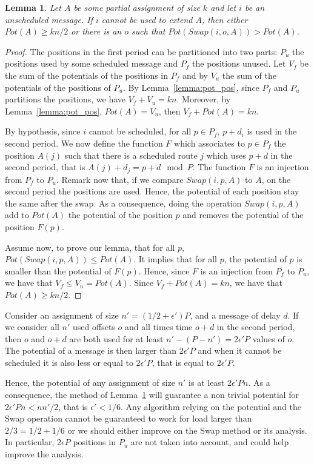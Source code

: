 \documentclass[10pt, conference, letterpaper]{IEEEtran}
\newtheorem{lemma}[theorem]{Lemma}
\begin{document}
\begin{lemma}\label{lemma:swap}
Let $A$ be some partial assignment of size $k$ and let $i$ be an unscheduled message. If $i$ cannot be used to extend $A$, then either $Pot(A) \geq kn/2$ or there is an $o$ such that $Pot(Swap(i,o,A)) > Pot(A)$.
\end{lemma}

\begin{proof}
The positions in the first period can be partitioned into two parts: $P_{u}$ the positions used by some scheduled message and $P_{f}$ the positions unused.
Let $V_f$ be the sum of the potentials of the positions in $P_f$ and by $V_u$ the sum of the potentials of the positions of $P_u$. By Lemma~\ref{lemma:pot_pos}, since $P_f$ and $P_u$ partitions the positions, we have $V_f + V_u = kn$. Moreover, by Lemma~\ref{lemma:pot_pos}, $Pot(A) = V_u$, then $V_f + Pot(A) = kn$.

By hypothesis, since $i$ cannot be scheduled, for all $p \in P_{f}$, $p+d_i$ is used in the second period. We now define the function $F$ which associates to $p \in P_{f}$ the position $A(j)$ such that there is a scheduled route $j$ which uses $p+d$ in the second period, that is $A(j) + d_j = p + d \mod P$. The function $F$ is an injection from $P_{f}$ to $P_u$. Remark now that, if we compare $Swap(i,p,A)$ to $A$, on the second period the positions are used. Hence, the potential of each position stay the same after the swap. As a consequence, doing the operation $Swap(i,p,A)$ add to $Pot(A)$ the potential of the position $p$ and removes the potential of the position $F(p)$. 

Assume now, to prove our lemma, that for all $p$, $Pot(Swap(i,p,A)) \leq Pot(A)$. It implies that for all $p$, the potential of $p$ is smaller than the potential of $F(p)$. Hence, since $F$ is an injection from $P_f$ to $P_u$, we have that $V_f \leq V_u = Pot(A)$. Since $V_f + Pot(A) = kn$, we have that $Pot(A) \geq kn/2$.
\end{proof}

Consider an assignment of size $n' = (1/2 + \epsilon')P$, and a message of delay $d$.
If we consider all $n'$ used offsets $o$ and all times time $o+d$ in the second period, 
then $o$ and $o+d$ are both used for at least $n' - (P -n') = 2\epsilon' P$ values of $o$.
The potential of a message is then larger than $2\epsilon' P$ and when it cannot be scheduled
it is also less or equal to $2\epsilon' P$, that is equal to $2\epsilon' P$.

Hence, the potential of any assignment of size $n'$ is at least $2\epsilon' P n $. As a consequence, the method of Lemma~\ref{lemma:swap} will guarantee a non trivial potential for $2\epsilon' P n <  nn'/2$, that is $\epsilon' < 1/6$. Any algorithm relying on the potential and the Swap operation cannot be guaranteed to work for load larger than $2/3 = 1/2 + 1/6$ or we should either improve on the Swap method or its analysis. In particular, $2\epsilon P$ positions in $P_{u}$
are not taken into account, and could help improve the analysis.
\end{document}
